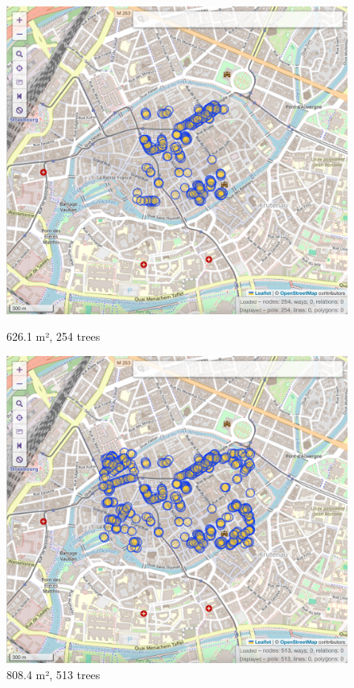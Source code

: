\documentclass[12pt]{article}
\begin{document}
\begin{figure}[H]
    \centering
    \begin{minipage}{0.45\textwidth}
        \centering
        \includegraphics[width=\textwidth]{images/ovt-bbox3.png}
        \caption{626.1 m², 254 trees}
    \end{minipage}\hfill
    \begin{minipage}{0.45\textwidth}
        \centering
        \includegraphics[width=\textwidth]{images/ovt-bbox4.png}
        \caption{808.4 m², 513 trees}
    \end{minipage}
\end{figure}
\end{document}
